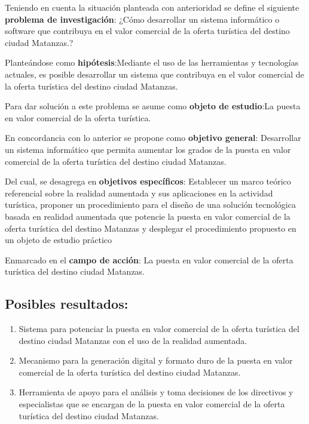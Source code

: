 Teniendo en cuenta la situación planteada con anterioridad se define el siguiente \textbf{problema de investigación}: ¿Cómo desarrollar un sistema informático o software que contribuya en el valor comercial de la oferta turística del destino ciudad Matanzas.?

Planteándose como \textbf{hipótesis}:Mediante el uso de las herramientas y tecnologías actuales, es posible desarrollar un sistema que contribuya en el valor comercial de la oferta turística del destino ciudad Matanzas.

Para dar solución a este problema se asume como \textbf{objeto de estudio}:La puesta en valor comercial de la oferta turística.

En concordancia con lo anterior se propone como \textbf{objetivo general}: Desarrollar un sistema informático que permita aumentar los grados de la puesta en valor comercial de la oferta turística del destino ciudad Matanzas.

Del cual, se desagrega en \textbf{objetivos específicos}: Establecer un marco teórico referencial sobre la realidad aumentada y sus aplicaciones en la actividad turística, proponer un procedimiento para el diseño de una solución tecnológica basada en realidad aumentada que potencie la puesta en valor comercial de la oferta turística del destino Matanzas y desplegar el procedimiento propuesto en un objeto de estudio práctico

Enmarcado en el \textbf{campo de acción}: La puesta en valor comercial de la oferta turística del destino ciudad Matanzas.

\subsection*{Posibles resultados:}

\begin{enumerate}
	\item Sistema para potenciar la puesta en valor comercial de la oferta turística del destino ciudad Matanzas con el uso de la realidad aumentada.
	\item Mecanismo para la generación digital y formato duro de la puesta en valor comercial de la oferta turística del destino ciudad Matanzas.
	\item Herramienta de apoyo para el análisis y toma decisiones de los directivos y especialistas que se encargan de la puesta en valor comercial de la oferta turística del destino ciudad Matanzas.
\end{enumerate}

